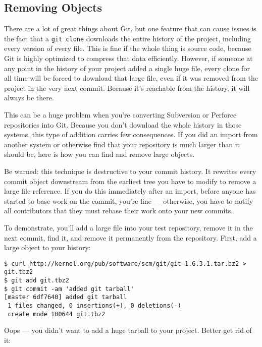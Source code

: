 \documentclass[a4paper]{book}
\begin{document}
\subsection{Removing Objects}

There are a lot of great things about Git, but one feature that can cause issues is the fact that a \texttt{git clone} downloads the entire history of the project, including every version of every file. This is fine if the whole thing is source code, because Git is highly optimized to compress that data efficiently. However, if someone at any point in the history of your project added a single huge file, every clone for all time will be forced to download that large file, even if it was removed from the project in the very next commit. Because it's reachable from the history, it will always be there.

This can be a huge problem when you're converting Subversion or Perforce repositories into Git. Because you don't download the whole history in those systems, this type of addition carries few consequences. If you did an import from another system or otherwise find that your repository is much larger than it should be, here is how you can find and remove large objects.

Be warned: this technique is destructive to your commit history. It rewrites every commit object downstream from the earliest tree you have to modify to remove a large file reference. If you do this immediately after an import, before anyone has started to base work on the commit, you're fine --- otherwise, you have to notify all contributors that they must rebase their work onto your new commits.

To demonstrate, you'll add a large file into your test repository, remove it in the next commit, find it, and remove it permanently from the repository. First, add a large object to your history:

\begin{shaded}\begin{verbatim}
$ curl http://kernel.org/pub/software/scm/git/git-1.6.3.1.tar.bz2 > git.tbz2
$ git add git.tbz2
$ git commit -am 'added git tarball'
[master 6df7640] added git tarball
 1 files changed, 0 insertions(+), 0 deletions(-)
 create mode 100644 git.tbz2
\end{verbatim}\end{shaded}

Oops --- you didn't want to add a huge tarball to your project. Better get rid of it:
\end{document}
